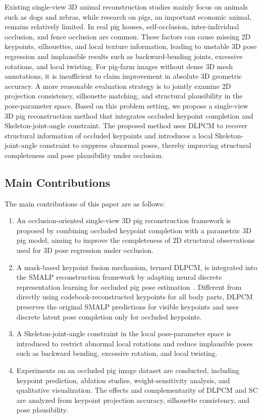 \documentclass[runningheads]{llncs}
\begin{document}
Existing single-view 3D animal reconstruction studies mainly focus on animals such as dogs and zebras, while research on pigs, an important economic animal, remains relatively limited. In real pig houses, self-occlusion, inter-individual occlusion, and fence occlusion are common. These factors can cause missing 2D keypoints, silhouettes, and local texture information, leading to unstable 3D pose regression and implausible results such as backward-bending joints, excessive rotations, and local twisting. For pig-farm images without dense 3D mesh annotations, it is insufficient to claim improvement in absolute 3D geometric accuracy. A more reasonable evaluation strategy is to jointly examine 2D projection consistency, silhouette matching, and structural plausibility in the pose-parameter space. Based on this problem setting, we propose a single-view 3D pig reconstruction method that integrates occluded keypoint completion and Skeleton-joint-angle constraint. The proposed method uses DLPCM to recover structural information of occluded keypoints and introduces a local Skeleton-joint-angle constraint to suppress abnormal poses, thereby improving structural completeness and pose plausibility under occlusion.

\subsection{Main Contributions}

The main contributions of this paper are as follows:

\begin{enumerate}
\item An occlusion-oriented single-view 3D pig reconstruction framework is proposed by combining occluded keypoint completion with a parametric 3D pig model, aiming to improve the completeness of 2D structural observations used for 3D pose regression under occlusion.

\item A mask-based keypoint fusion mechanism, termed DLPCM, is integrated into the SMALP reconstruction framework by adapting neural discrete representation learning for occluded pig pose estimation~\cite{ref28}. Different from directly using codebook-reconstructed keypoints for all body parts, DLPCM preserves the original SMALP predictions for visible keypoints and uses discrete latent pose completion only for occluded keypoints.

\item A Skeleton-joint-angle constraint in the local pose-parameter space is introduced to restrict abnormal local rotations and reduce implausible poses such as backward bending, excessive rotation, and local twisting.

\item Experiments on an occluded pig image dataset are conducted, including keypoint prediction, ablation studies, weight-sensitivity analysis, and qualitative visualization. The effects and complementarity of DLPCM and SC are analyzed from keypoint projection accuracy, silhouette consistency, and pose plausibility.
\end{enumerate}
\end{document}
